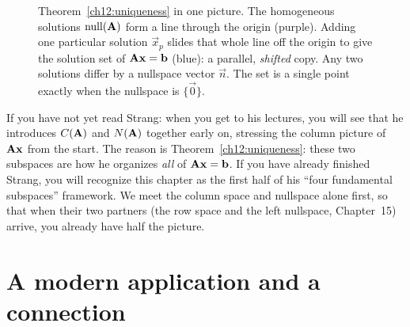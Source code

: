 \begin{figure}[htbp]
\centering
{}
\caption{Theorem~\ref{ch12:uniqueness} in one picture. The homogeneous solutions
$\operatorname{null}(\mathbf{A})$ form a line through the origin (purple). Adding one particular
solution $\vec{x}_p$ slides that whole line off the origin to give the solution
set of $\mathbf{A}\mathbf{x}=\mathbf{b}$ (blue): a parallel, \emph{shifted} copy. Any two
solutions differ by a nullspace vector $\vec{n}$. The set is a single point
exactly when the nullspace is $\{\vec 0\}$.}
\label{ch12:fig-affine}
\end{figure}

\begin{strangbox}
If you have not yet read Strang: when you get to his lectures, you will see that he
introduces $C(\mathbf{A})$ and $N(\mathbf{A})$ together early on, stressing the column
picture of $\mathbf{A}\mathbf{x}$ from the start. The reason is
Theorem~\ref{ch12:uniqueness}: these two subspaces are how he organizes
\emph{all} of $\mathbf{A}\mathbf{x}=\mathbf{b}$. If you have already finished Strang, you
will recognize this chapter as the first half of his ``four fundamental
subspaces'' framework. We meet the column space and nullspace alone first,
so that when their two partners (the row space and the left nullspace, Chapter~15) arrive, you
already have half the picture.
\end{strangbox}

\section{A modern application and a connection}

